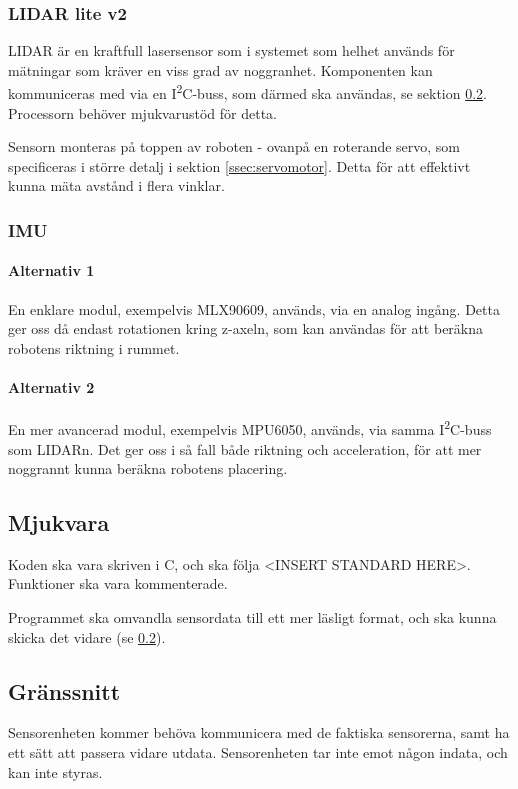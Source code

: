 \documentclass[a4paper,11pt]{article}
\begin{document}
\subsubsection{LIDAR lite v2} \label{sssec:lidar}
LIDAR är en kraftfull lasersensor som i systemet som helhet används för mätningar som kräver en viss grad av noggranhet. Komponenten kan kommuniceras med via en I\textsuperscript{2}C-buss, som därmed ska användas, se sektion \ref{ssec:sensorInterface}. Processorn behöver mjukvarustöd för detta.

Sensorn monteras på toppen av roboten - ovanpå en roterande servo, som specificeras i större detalj i sektion \ref{ssec:servomotor}. Detta för att effektivt kunna mäta avstånd i flera vinklar.

\subsubsection{IMU} \label{sssec:imu}

\paragraph{Alternativ 1}
En enklare modul, exempelvis MLX90609, används, via en analog ingång. Detta ger oss då endast rotationen kring z-axeln, som kan användas för att beräkna robotens riktning i rummet.

\paragraph{Alternativ 2}
En mer avancerad modul, exempelvis MPU6050, används, via samma I\textsuperscript{2}C-buss som LIDARn. Det ger oss i så fall både riktning och acceleration, för att mer noggrannt kunna beräkna robotens placering. %

\subsection{Mjukvara}

Koden ska vara skriven i C, och ska följa <INSERT STANDARD HERE>. Funktioner ska vara kommenterade.

Programmet ska omvandla sensordata till ett mer läsligt format, och ska kunna skicka det vidare (se \ref{ssec:sensorInterface}).

\subsection{Gränssnitt} \label{ssec:sensorInterface}
Sensorenheten kommer behöva kommunicera med de faktiska sensorerna, samt ha ett sätt att passera vidare utdata. Sensorenheten tar inte emot någon indata, och kan inte styras.
\end{document}
